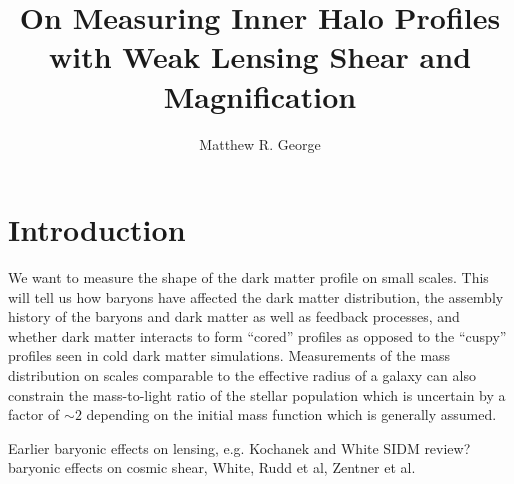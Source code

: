 \documentclass[12pt]{emulateapj}
\begin{document}
  

 \title{On Measuring Inner Halo Profiles with Weak Lensing Shear and Magnification}



\author{Matthew R. George}


  
\begin{abstract}
\end{abstract}
 



\section{Introduction}

We want to measure the shape of the dark matter profile on small
scales. This will tell us how baryons have affected the dark matter
distribution, the assembly history of the baryons and dark matter as
well as feedback processes, and whether dark matter interacts to form
``cored'' profiles as opposed to the ``cuspy'' profiles seen in cold
dark matter simulations. Measurements of the mass distribution on
scales comparable to the effective radius of a galaxy can also
constrain the mass-to-light ratio of the stellar population which is
uncertain by a factor of $\sim2$ depending on the initial mass
function which is generally assumed.

Earlier baryonic effects on lensing, e.g. Kochanek and White 
SIDM review?
baryonic effects on cosmic shear, White, Rudd et al, Zentner et al.
\end{document}

